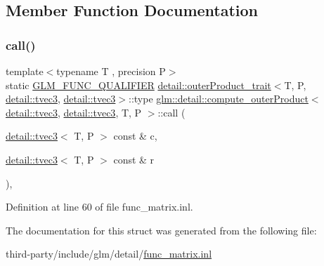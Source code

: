 \subsection{Member Function Documentation}
\mbox{\label{structglm_1_1detail_1_1compute__outer_product_3_01detail_1_1tvec3_00_01detail_1_1tvec3_00_01_t_00_01_p_01_4_ab97eae3a1827791b1e9e3324ea454b2d}} 
\subsubsection{\texorpdfstring{call()}{call()}}
{\footnotesize\ttfamily template$<$typename T , precision P$>$ \\
static \hyperlink{setup_8hpp_a33fdea6f91c5f834105f7415e2a64407}{G\+L\+M\+\_\+\+F\+U\+N\+C\+\_\+\+Q\+U\+A\+L\+I\+F\+I\+ER} \hyperlink{structglm_1_1detail_1_1outer_product__trait}{detail\+::outer\+Product\+\_\+trait}$<$T, P, \hyperlink{structglm_1_1detail_1_1tvec3}{detail\+::tvec3}, \hyperlink{structglm_1_1detail_1_1tvec3}{detail\+::tvec3}$>$\+::type \hyperlink{structglm_1_1detail_1_1compute__outer_product}{glm\+::detail\+::compute\+\_\+outer\+Product}$<$ \hyperlink{structglm_1_1detail_1_1tvec3}{detail\+::tvec3}, \hyperlink{structglm_1_1detail_1_1tvec3}{detail\+::tvec3}, T, P $>$\+::call (\begin{DoxyParamCaption}\item[{\hyperlink{structglm_1_1detail_1_1tvec3}{detail\+::tvec3}$<$ T, P $>$ const \&}]{c,  }\item[{\hyperlink{structglm_1_1detail_1_1tvec3}{detail\+::tvec3}$<$ T, P $>$ const \&}]{r }\end{DoxyParamCaption})\hspace{0.3cm}{\ttfamily [inline]}, {\ttfamily [static]}}



Definition at line 60 of file func\+\_\+matrix.\+inl.



The documentation for this struct was generated from the following file\+:\begin{DoxyCompactItemize}
\item 
third-\/party/include/glm/detail/\hyperlink{func__matrix_8inl}{func\+\_\+matrix.\+inl}\end{DoxyCompactItemize}
